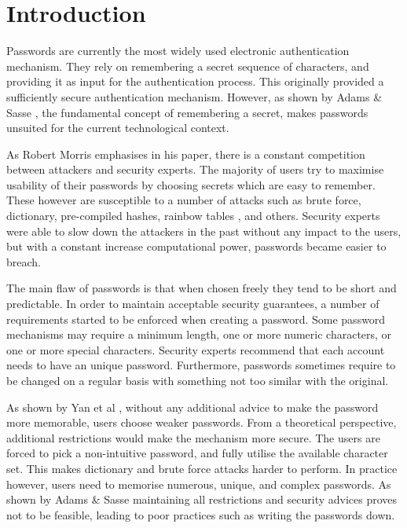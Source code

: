 
\chapter{Introduction} %

\label{Chapter1}


Passwords are currently the most widely used electronic authentication mechanism. They rely on remembering a secret sequence of characters, and providing it as input for the authentication process. This originally provided a sufficiently secure authentication mechanism. However, as shown by Adams \& Sasse \cite{adams1999users}, the fundamental concept of remembering a secret, makes passwords unsuited for the current technological context. 

As Robert Morris \cite{morris1979password} emphasises in his paper, there is a constant competition between attackers and security experts. The majority of users try to maximise usability of their passwords by choosing secrets which are easy to remember. These however are susceptible to a number of attacks such as brute force, dictionary, pre-compiled hashes, rainbow tables \cite{oechslin2003making}, and others. Security experts were able to slow down the attackers in the past without any impact to the users, but with a constant increase computational power, passwords became easier to breach. 

The main flaw of passwords is that when chosen freely they tend to be short and predictable. In order to maintain acceptable security guarantees, a number of requirements started to be enforced when creating a password. Some password mechanisms may require a minimum length, one or more numeric characters, or one or more special characters. Security experts recommend that each account needs to have an unique password. Furthermore, passwords sometimes require to be changed on a regular basis with something not too similar with the original. 

As shown by Yan et al \cite{yan2004password}, without any additional advice to make the password more memorable, users choose weaker passwords. From a theoretical perspective, additional restrictions would make the mechanism more secure. The users are forced to pick a non-intuitive password, and fully utilise the available character set. This makes dictionary and brute force attacks harder to perform. In practice however, users need to memorise numerous, unique, and complex passwords. As shown by Adams \& Sasse \cite{adams1999users} maintaining all restrictions and security advices proves not to be feasible, leading to poor practices such as writing the passwords down.

